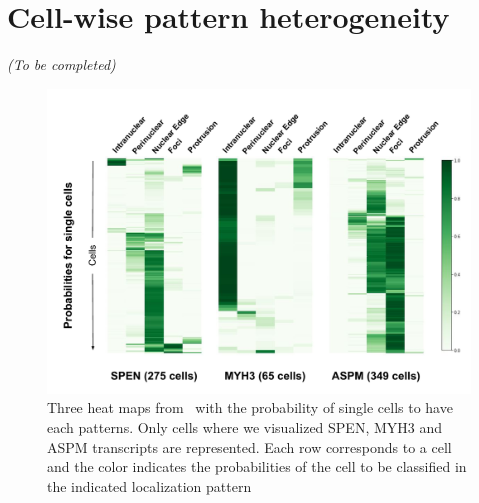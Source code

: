 

\vfill

\newpage

\section{Cell-wise pattern heterogeneity}
\label{sec:pattern_heterogeneity}

\begin{center}
	\textit{(To be completed)}
\end{center}

\vfill

\begin{figure}[h]
    \centering
    \includegraphics[width=\textwidth]{figures/appendix/heatmap_cell_racha}
    \caption{Three heat maps from~\cite{CHOUAIB_2020} with the probability of single cells to have each patterns.
	Only cells where we visualized SPEN, MYH3 and ASPM transcripts are represented.
	Each row corresponds to a cell and the color indicates the probabilities of the cell to be classified in the indicated localization pattern}
    \label{fig:heatmap_racha_cells}
\end{figure}



\vfill